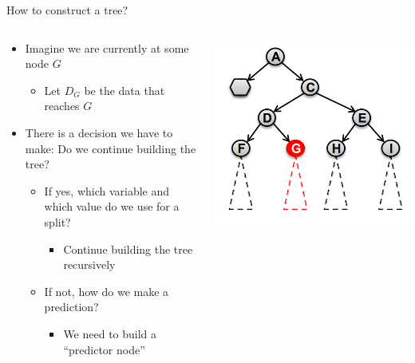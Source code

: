 \begin{frame}{How to construct a tree?}
    \begin{columns}
        \begin{column}{0.55\textwidth}
            \begin{itemize}
                \item Imagine we are currently at some node $G$
                \begin{itemize}
                    \item Let $D_G$ be the data that reaches $G$
                \end{itemize}
                \item There is a decision we have to make: Do we continue building the tree?
                \begin{itemize}
                    \item If yes, which variable and which value do we use for a split?
                    \begin{itemize}
                        \item Continue building the tree recursively
                    \end{itemize}
                    \item If not, how do we make a prediction?
                    \begin{itemize}
                        \item We need to build a “predictor node”
                    \end{itemize}
                \end{itemize}
            \end{itemize}
        \end{column}
        \begin{column}{0.45\textwidth}
            \includegraphics[width=\linewidth]{images/decision-trees/decision-trees-8.png}
        \end{column}
    \end{columns}
\end{frame}


